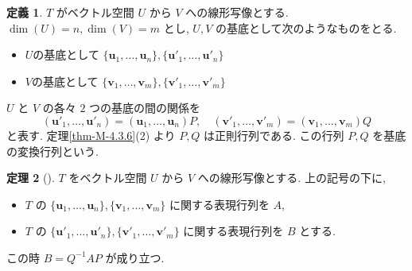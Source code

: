 \documentclass[dvipdfmx,a4paper,11pt]{article} %
\theoremstyle{definition}
\newtheorem{thm}{定理}[section]
\newtheorem{defn}[thm]{定義}
\begin{document}
\begin{defn}
\(T\) がベクトル空間 \(U\) から \(V\) への線形写像とする.
\(
\dim(U)=n,\dim(V)=m
\)
とし, \(U,V\) の基底として次のようなものをとる.
\begin{itemize}
\item $U$の基底として
$\{\bm{u}_1,\ldots,\bm{u}_n\},
\{\bm{u}'_1,\ldots,\bm{u}'_n\}$
\item $V$の基底として
$\{\bm{v}_1,\ldots,\bm{v}_m\},
\{\bm{v}'_1,\ldots,\bm{v}'_m\}
$
\end{itemize}
\(U\) と \(V\) の各々 \(2\) つの基底の間の関係を
\[
(\bm{u}'_1,\ldots,\bm{u}'_n)
=
(\bm{u}_1,\ldots,\bm{u}_n)P,
\quad
(\bm{v}'_1,\ldots,\bm{v}'_m)
=
(\bm{v}_1,\ldots,\bm{v}_m)Q
\]
と表す. 定理\ref{thm-M-4.3.6}(2) より \(P,Q\) は正則行列である. この行列 \(P,Q\) を基底の変換行列という.
\end{defn}

\begin{thm}[{\cite[定理5.2.1]{M}}]
\(T\) をベクトル空間 \(U\) から \(V\) への線形写像とする. 上の記号の下に,
\begin{itemize}
\item \(T\) の
\(
\{\bm{u}_1,\ldots,\bm{u}_n\},
\{\bm{v}_1,\ldots,\bm{v}_m\}
\)
に関する表現行列を \(A\),
\item \(T\) の
\(
\{\bm{u}'_1,\ldots,\bm{u}'_n\},
\{\bm{v}'_1,\ldots,\bm{v}'_m\}
\)
に関する表現行列を \(B\) とする.
\end{itemize}
この時
\(
B=Q^{-1}AP
\)
が成り立つ. 
\end{thm}
\end{document}
